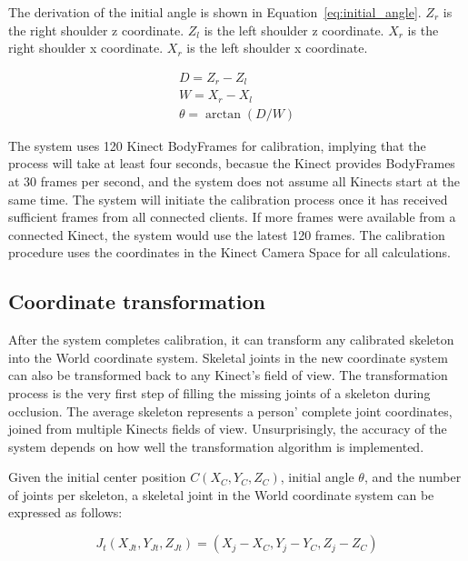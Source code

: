 The derivation of the initial angle is shown in Equation~\ref{eq:initial_angle}. $Z_r$ is the right shoulder z coordinate. $Z_l$ is the left shoulder z coordinate. $X_r$ is the right shoulder x coordinate. $X_r$ is the left shoulder x coordinate.

\begin{equation}[!h]
\label{eq:initial_angle}
\begin{gathered}
D = Z_r - Z_l \\
W = X_r - X_l \\
\theta = \arctan(D/W)
\end{gathered}
\end{equation}


The system uses 120 Kinect BodyFrames for calibration, implying that the process will take at least four seconds, becasue the Kinect provides BodyFrames at 30 frames per second, and the system does not assume all Kinects start at the same time. The system will initiate the calibration process once it has received sufficient frames from all connected clients. If more frames were available from a connected Kinect, the system would use the latest 120 frames. The calibration procedure uses the coordinates in the Kinect Camera Space for all calculations.

\subsection{Coordinate transformation}

After the system completes calibration, it can transform any calibrated skeleton into the World coordinate system. Skeletal joints in the new coordinate system can also be transformed back to any Kinect's field of view. The transformation process is the very first step of filling the missing joints of a skeleton during occlusion. The average skeleton represents a person' complete joint coordinates, joined from multiple Kinects fields of view. Unsurprisingly, the accuracy of the system depends on how well the transformation algorithm is implemented.

Given the initial center position $C(X_C, Y_C, Z_C)$, initial angle $\theta$, and the number of joints per skeleton, a skeletal joint in the World coordinate system can be expressed as follows:

\begin{equation}[!h]
\label{eq:joint_translated}
J_t (X_{Jt}, Y_{Jt}, Z_{Jt}) = (X_j - X_C, Y_j - Y_C, Z_j - Z_C)
\end{equation}

